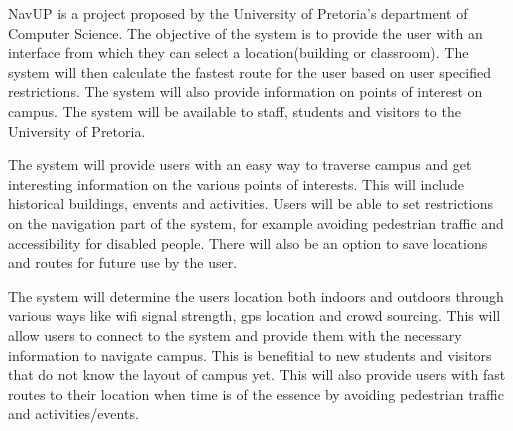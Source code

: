 NavUP is a project proposed by the University of Pretoria’s department of Computer Science. The objective of the system is to provide the user with an interface from which they can select a location(building or classroom). The system will then calculate the fastest route for the user based on user specified restrictions. The system will also provide information on points of interest on campus. The system will be available to staff, students and visitors to the University of Pretoria.

The system will provide users with an easy way to traverse campus and get interesting information on the various points of interests. This will include historical buildings, envents and activities. Users will be able to set restrictions on the navigation part of the system, for example avoiding pedestrian traffic and accessibility for disabled people. There will also be an option to save locations and routes for future use by the user.

The system will determine the users location both indoors and outdoors through various ways like wifi signal strength, gps location and crowd sourcing. This will allow users to connect to the system and provide them with the necessary information to navigate campus. This is benefitial to new students and visitors that do not know the layout of campus yet. This will also provide users with fast routes to their location when time is of the essence by avoiding pedestrian traffic and activities/events.
